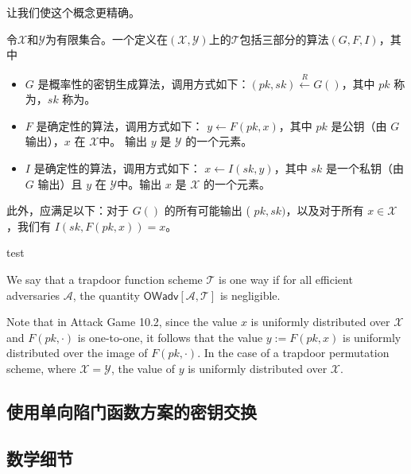 让我们使这个概念更精确。

\begin{definition}
    令$\mathcal{X}$和$\mathcal{Y}$为有限集合。一个定义在$(\mathcal{X}, \mathcal{Y})$上的$\mathcal{T}$包括三部分的算法$(G, F, I)$，其中
    \begin{itemize}
        \item $G$ 是概率性的密钥生成算法，调用方式如下：$(p k, s k) \stackrel{R}{\leftarrow} G()$，其中 $p k$ 称为，$sk$ 称为。
        \item $F$ 是确定性的算法，调用方式如下： $y \leftarrow F(p k, x)$，其中 $p k$ 是公钥（由 $G$ 输出），$x$ 在 $\mathcal{X }$中。 输出 $y$ 是 $\mathcal{Y}$ 的一个元素。
        \item $I$ 是确定性的算法，调用方式如下： $x \leftarrow I(s k, y)$，其中 $sk$ 是一个私钥（由 $G$ 输出）且 $y$ 在 $\mathcal{Y}$中。输出 $x$ 是 $\mathcal{X}$ 的一个元素。

    \end{itemize}
    此外，应满足以下：对于 $G()$ 的所有可能输出 ( $p k, s k)$，以及对于所有 $x \in \mathcal{X}$，我们有 $I(s k, F (pk,x))=x$。
    
\end{definition}

\begin{theorem}
    test
\end{theorem}

\begin{definition}
    We say that a trapdoor function scheme $\mathcal{T}$ is one way if for all efficient adversaries $\mathcal{A}$, the quantity $\mathsf{OWadv}[\mathcal{A}, \mathcal{T}]$ is negligible.    
\end{definition}


Note that in Attack Game 10.2, since the value $x$ is uniformly distributed over $\mathcal{X}$ and $F(p k, \cdot)$ is one-to-one, it follows that the value $y:=F(p k, x)$ is uniformly distributed over the image of $F(p k, \cdot)$. In the case of a trapdoor permutation scheme, where $\mathcal{X}=\mathcal{Y}$, the value of $y$ is uniformly distributed over $\mathcal{X}$.


\subsection{使用单向陷门函数方案的密钥交换}
\subsection{数学细节}

